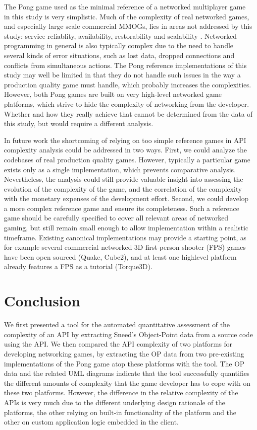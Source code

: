\documentclass[conference]{IEEEtran}
\begin{document}
The Pong game used as the minimal reference of a networked multiplayer
game in this study is very simplistic. Much of the complexity of real
networked games, and especially large scale commercial MMOGs, lies in
areas not addressed by this study: service reliablity, availability,
restorability and scalability \cite{middleware}. Networked programming
in general is also typically complex due to the need to handle several
kinds of error situations, such as lost data, dropped connections and
conflicts from simultaneous actions. The Pong reference
implementations of this study may well be limited in that they do not
handle such issues in the way a production quality game must handle,
which probably increases the complexities. However, both Pong games
are built on very high-level networked game platforms, which strive to
hide the complexity of networking from the developer. Whether and how
they really achieve that cannot be determined from the data of this
study, but would require a different analysis.

In future work the shortcoming of relying on too simple reference
games in API complexity analysis could be addressed in two
ways. First, we could analyze the codebases of real production quality
games. However, typically a particular game exists only as a single
implementation, which prevents comparative analysis. Nevertheless, the
analysis could still provide valuable insight into assessing the
evolution of the complexity of the game, and the correlation of the
complexity with the monetary expenses of the development
effort. Second, we could develop a more complex reference game and
ensure its completeness. Such a reference game should be carefully
specified to cover all relevant areas of networked gaming, but still
remain small enough to allow implementation within a realistic
timeframe. Existing canonical implementations may provide a starting
point, as for example several commercial networked 3D first-person
shooter (FPS) games have been open sourced (Quake, Cube2), and at
least one highlevel platform already features a FPS as a tutorial
(Torque3D).


\section{Conclusion%
  \label{conclusion}%
}

We first presented a tool for the automated quantitative assessment of
the complexity of an API by extracting Sneed’s Object-Point data from
a source code using the API. We then compared the API complexity of
two platforms for developing networking games, by extracting the OP
data from two pre-existing implementations of the Pong game atop these
platforms with the tool. The OP data and the related UML diagrams
indicate that the tool successfully quantifies the different amounts
of complexity that the game developer has to cope with on these two
platforms. However, the difference in the relative complexity of the
APIs is very much due to the different underlying design rationale of
the platforms, the other relying on built-in functionality of the
platform and the other on custom application logic embedded in the
client.
\end{document}
